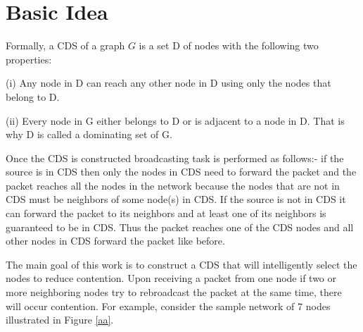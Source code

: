 \section{Basic Idea}
\label{Basic Idea}
Formally, a CDS of a graph $G$ is a set D of nodes with the following two properties:

(i) Any node in D can reach any other node in D using only the nodes that belong to D. 

(ii) Every node in G either belongs to D or is adjacent to a node in D. That is why D is called a dominating set of G.

Once the CDS is constructed broadcasting task is performed as follows:- if the source is in CDS then only the nodes in CDS need to forward the packet and the packet reaches all the nodes in the network because the nodes that are not in CDS must be neighbors of some node(s) in CDS. If the source is not in  CDS it can forward the packet to its neighbors and at least one of its neighbors is guaranteed to be in CDS. Thus the packet reaches one of the CDS nodes and all other nodes in CDS forward the packet like before.

 The main goal of this work is to construct a CDS 
 that will intelligently select the nodes to reduce contention.  Upon receiving a packet from one node if two or more neighboring nodes try to rebroadcast the packet at the same time, there will occur contention. For example, consider the sample network of 7 nodes illustrated in Figure \ref{aa}.
 
